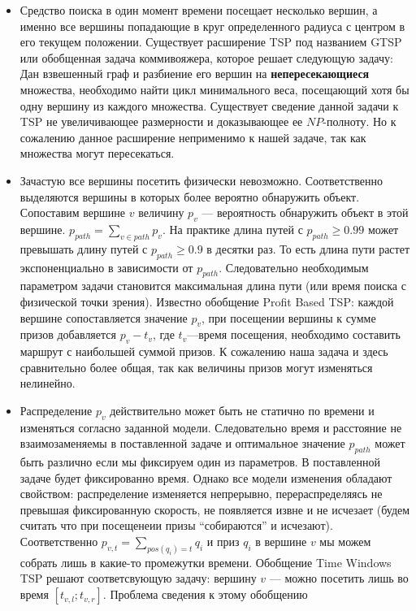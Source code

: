 \begin{itemize}
\item{Средство поиска в один момент времени посещает несколько вершин, а именно все вершины
попадающие в круг определенного радиуса с центром в его текущем положении.
Существует расширение TSP под названием GTSP или обобщенная задача коммивояжера, которое решает
следующую задачу:
Дан взвешенный граф и разбиение его вершин на \textbf{непересекающиеся} множества, необходимо
найти цикл минимального веса, посещающий хотя бы одну вершину из каждого множества.
Существует сведение данной задачи к TSP не увеличивающее размерности и доказывающее ее $NP$-полноту.
Но к сожалению данное расширение неприменимо к нашей задаче, так как множества могут пересекаться.}
\item{Зачастую все вершины посетить физически невозможно. 
Соответственно выделяются вершины в которых более вероятно обнаружить объект.
 Сопоставим вершине $v$ величину $p_v$ --- вероятность обнаружить объект в этой вершине.
 $p_{path}=\sum\limits_{v\in path}p_v$. На практике длина путей с $p_{path} \ge 0.99$ может превышать
длину путей с $p_{path} \ge 0.9$ в десятки раз. То есть длина пути растет экспоненциально
в зависимости от $p_{path}$. Следовательно необходимым параметром задачи становится максимальная длина
пути (или время поиска с физической точки зрения). Известно обобщение Profit Based TSP:
каждой вершине сопоставляется значение $p_v$, при посещении вершины к сумме призов 
добавляется $p_v-t_v$, где $t_v$---время посещения, необходимо составить маршрут с
наибольшей суммой призов. К сожалению наша задача и здесь сравнительно более общая, так как
величины призов могут изменяться нелинейно.}
\item{Распределение $p_v$ действительно может быть не статично по времени и изменяться согласно
заданной модели. Следовательно время и расстояние не взаимозаменяемы в поставленной задаче и
оптимальное значение $p_{path}$ может быть различно если мы фиксируем один из параметров.
В поставленной задаче будет фиксированно время. Однако все модели изменения обладают свойством:
распределение изменяется непрерывно, перераспределяясь не превышая фиксированную скорость,
не появляется извне и не исчезает (будем считать что при посещенеии призы ``собираются'' и исчезают).
Соответственно $p_{v,t}=\sum_{pos(q_i)=t}q_i$ и приз $q_i$ в вершине $v$ мы можем собрать лишь в какие-то
промежутки времени. Обобщение Time Windows TSP решают соответсвующую задачу:
вершину $v$ --- можно посетить лишь во время $[t_{v,l}; t_{v,r}]$. Проблема сведения к этому обобщению
}
\end{itemize}
